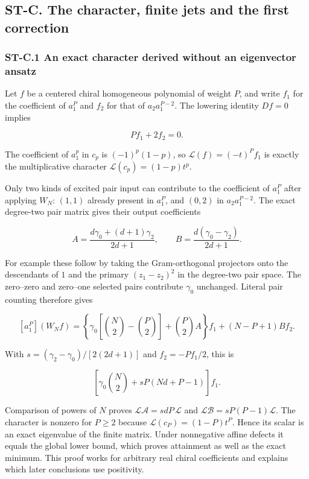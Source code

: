 \hypertarget{st-c.-the-character-finite-jets-and-the-first-correction}{%
\subsection{ST-C. The character, finite jets and the first correction}\label{st-c.-the-character-finite-jets-and-the-first-correction}}

\hypertarget{st-c.1-an-exact-character-derived-without-an-eigenvector-ansatz}{%
\subsubsection{ST-C.1 An exact character derived without an eigenvector ansatz}\label{st-c.1-an-exact-character-derived-without-an-eigenvector-ansatz}}

Let \(f\) be a centered chiral homogeneous polynomial of weight \(P\), and write \(f_1\) for the coefficient of \(a_1^P\) and \(f_2\) for that of \(a_2a_1^{P-2}\). The lowering identity \(Df=0\) implies

\[
Pf_1+2f_2=0.
\]

The coefficient of \(a_1^p\) in \(c_p\) is \((-1)^p(1-p)\), so \(\mathcal L(f)=(-t)^P f_1\) is exactly the multiplicative character \(\mathcal L(c_p)=(1-p)t^p\).

Only two kinds of excited pair input can contribute to the coefficient of \(a_1^P\) after applying \(W_N\): \((1,1)\) already present in \(a_1^P\), and \((0,2)\) in \(a_2a_1^{P-2}\). The exact degree-two pair matrix gives their output coefficients

\[
A=\frac{d\gamma_0+(d+1)\gamma_2}{2d+1},
\qquad B=\frac{d(\gamma_0-\gamma_2)}{2d+1}.
\]

For example these follow by taking the Gram-orthogonal projectors onto the descendants of \(1\) and the primary \((z_1-z_2)^2\) in the degree-two pair space. The zero--zero and zero--one selected pairs contribute \(\gamma_0\) unchanged. Literal pair counting therefore gives

\[
[a_1^P](W_N f)=
\left\{\gamma_0\left[\binom N2-\binom P2\right]
+\binom P2 A\right\}f_1
+(N-P+1)Bf_2.
\]

With \(s=(\gamma_2-\gamma_0)/[2(2d+1)]\) and \(f_2=-Pf_1/2\), this is

\[
\left[\gamma_0\binom N2+sP(Nd+P-1)\right]f_1.
\]

Comparison of powers of \(N\) proves \(\mathcal L\mathscr A=sdP\,\mathcal L\) and \(\mathcal L\mathscr B=sP(P-1)\mathcal L\). The character is nonzero for \(P\geq2\) because \(\mathcal L(c_P)=(1-P)t^P\). Hence its scalar is an exact eigenvalue of the finite matrix. Under nonnegative affine defects it equals the global lower bound, which proves attainment as well as the exact minimum. This proof works for arbitrary real chiral coefficients and explains which later conclusions use positivity.

